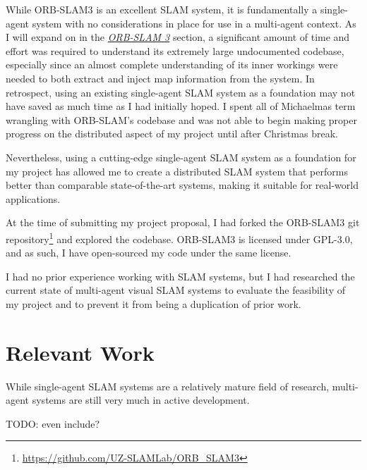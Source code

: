 While ORB-SLAM3 is an excellent SLAM system, it is fundamentally a single-agent system with no considerations in place for use in a multi-agent context. As I will expand on in the \hyperref[sec:orb-slam-3]{\textit{ORB-SLAM 3}} section, a significant amount of time and effort was required to understand its extremely large undocumented codebase, especially since an almost complete understanding of its inner workings were needed to both extract and inject map information from the system. In retrospect, using an existing single-agent SLAM system as a foundation may not have saved as much time as I had initially hoped. I spent all of Michaelmas term wrangling with ORB-SLAM's codebase and was not able to begin making proper progress on the distributed aspect of my project until after Christmas break.

Nevertheless, using a cutting-edge single-agent SLAM system as a foundation for my project has allowed me to create a distributed SLAM system that performs better than comparable state-of-the-art systems, making it suitable for real-world applications.

At the time of submitting my project proposal, I had forked the ORB-SLAM3 \autocite{ORBSLAM3_TRO} git repository\footnote[1]{\url{https://github.com/UZ-SLAMLab/ORB_SLAM3}} and explored the codebase. ORB-SLAM3 is licensed under GPL-3.0, and as such, I have open-sourced my code under the same license.

I had no prior experience working with SLAM systems, but I had researched the current state of multi-agent visual SLAM systems to evaluate the feasibility of my project and to prevent it from being a duplication of prior work.

\section{Relevant Work}
\label{sec:relevant-work}
While single-agent SLAM systems are a relatively mature field of research, multi-agent systems are still very much in active development.


TODO: even include?

